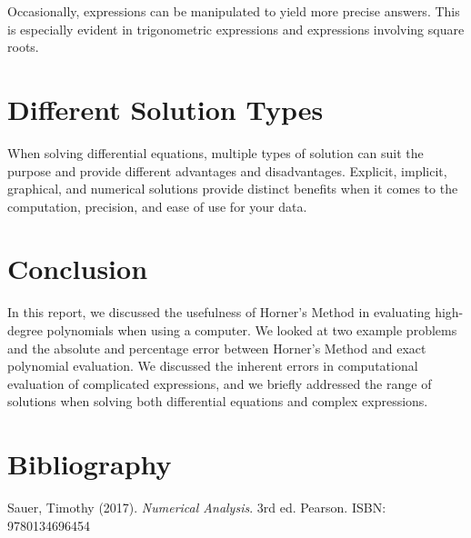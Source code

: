 \documentclass{article}
\begin{document}
Occasionally, expressions can be manipulated to yield more precise answers. This is especially 
evident in trigonometric expressions and expressions involving square roots.

\section {Different Solution Types}
When solving differential equations, multiple types of solution can suit the purpose and 
provide different advantages and disadvantages. Explicit, implicit, graphical, and numerical 
solutions provide distinct benefits when it comes to the computation, precision, and ease of 
use for your data.

\section{Conclusion}
In this report, we discussed the usefulness of Horner's Method in evaluating high-degree 
polynomials when using a computer. We looked at two example problems and the absolute and 
percentage error between Horner's Method and exact polynomial evaluation. We discussed the 
inherent errors in computational evaluation of complicated expressions, and we briefly addressed
the range of solutions when solving both differential equations and complex expressions.

\section{Bibliography}
Sauer, Timothy (2017). \textit{Numerical Analysis}. 3rd ed. Pearson. 
ISBN: 9780134696454
\end{document}
